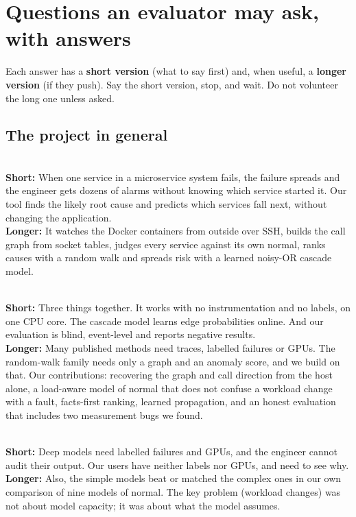 \chapter{Questions an evaluator may ask, with answers}
\label{ch:qa}

Each answer has a \textbf{short version} (what to say first) and, when useful, a \textbf{longer version} (if they push). Say the short version, stop, and wait. Do not volunteer the long one unless asked.

\section{The project in general}

\\
\textbf{Short:} When one service in a microservice system fails, the failure spreads and the engineer gets dozens of alarms without knowing which service started it. Our tool finds the likely root cause and predicts which services fall next, without changing the application.\\
\textbf{Longer:} It watches the Docker containers from outside over SSH, builds the call graph from socket tables, judges every service against its own normal, ranks causes with a random walk and spreads risk with a learned noisy-OR cascade model.

\\
\textbf{Short:} Three things together. It works with no instrumentation and no labels, on one CPU core. The cascade model learns edge probabilities online. And our evaluation is blind, event-level and reports negative results.\\
\textbf{Longer:} Many published methods need traces, labelled failures or GPUs. The random-walk family needs only a graph and an anomaly score, and we build on that. Our contributions: recovering the graph and call direction from the host alone, a load-aware model of normal that does not confuse a workload change with a fault, facts-first ranking, learned propagation, and an honest evaluation that includes two measurement bugs we found.

\\
\textbf{Short:} Deep models need labelled failures and GPUs, and the engineer cannot audit their output. Our users have neither labels nor GPUs, and need to see why.\\
\textbf{Longer:} Also, the simple models beat or matched the complex ones in our own comparison of nine models of normal. The key problem (workload changes) was not about model capacity; it was about what the model assumes.

